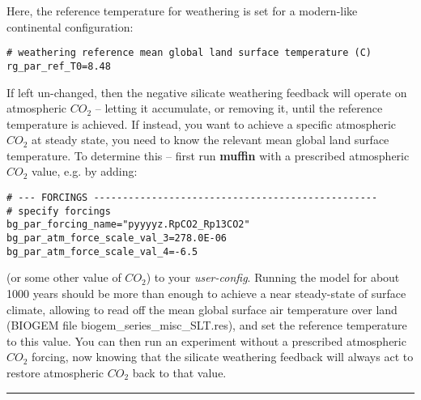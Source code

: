 \documentclass[11pt,fleqn]{book} %
\begin{document}
Here, the reference temperature for weathering is set for a modern-like continental configuration:
\vspace{-1mm}\small\begin{verbatim}
# weathering reference mean global land surface temperature (C)
rg_par_ref_T0=8.48
\end{verbatim}\normalsize\vspace{-1mm}
If left un-changed, then the negative silicate weathering feedback will operate on atmospheric \(CO_{2}\) -- letting it accumulate, or removing it, until the reference temperature is achieved. If instead, you want to achieve a specific atmospheric \(CO_{2}\) at steady state, you need to know the relevant mean global land surface temperature. To determine this -- first run \textbf{muffin} with a prescribed atmospheric \(CO_{2}\) value, e.g. by adding:
\vspace{-1mm}\small\begin{verbatim}
# --- FORCINGS -------------------------------------------------
# specify forcings
bg_par_forcing_name="pyyyyz.RpCO2_Rp13CO2"
bg_par_atm_force_scale_val_3=278.0E-06
bg_par_atm_force_scale_val_4=-6.5
\end{verbatim}\normalsize\vspace{-1mm}
(or some other value of \(CO_{2}\)) to your \textit{user-config}. Running the model for about 1000 years should be more than enough to achieve a near steady-state of surface climate, allowing to read off the mean global surface air temperature over land (BIOGEM file \textsf{\footnotesize biogem\_series\_misc\_SLT.res}), and set the reference temperature to this value. You can then run an experiment without a prescribed atmospheric \(CO_{2}\) forcing, now knowing that the silicate weathering feedback will always act to restore atmospheric \(CO_{2}\) back to that value.

\vspace{1mm}
\noindent\rule{4cm}{0.5pt}
\vspace{2mm}
\end{document}

